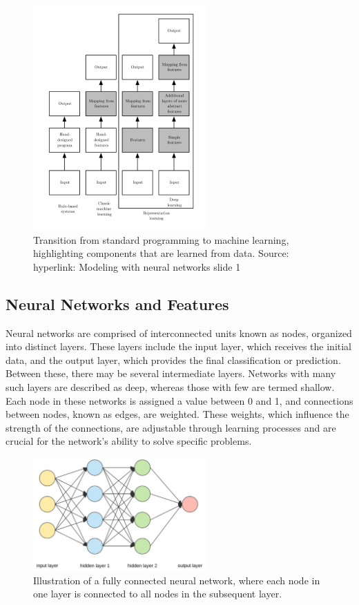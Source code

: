 \begin{figure}
    \centering
    \includegraphics[width=250px]{Figures/MLintro/ml.png}
    \caption{Transition from standard programming to machine learning, highlighting components that are learned from data. Source: hyperlink: Modeling with neural networks slide 1}
    \label{fig: fromProgrammingToML}
\end{figure}

\subsection{Neural Networks and Features}

Neural networks are comprised of interconnected units known as nodes, organized into distinct layers. These layers include the input layer, which receives the initial data, and the output layer, which provides the final classification or prediction. Between these, there may be several intermediate layers. Networks with many such layers are described as deep, whereas those with few are termed shallow\cite{Sarker2021}. Each node in these networks is assigned a value between 0 and 1, and connections between nodes, known as edges, are weighted. These weights, which influence the strength of the connections, are adjustable through learning processes and are crucial for the network's ability to solve specific problems\cite{Witten2005}.

\begin{figure}
    \centering
    \includegraphics[width=250px]{Figures/MLintro/nn.jpg}
    \caption{Illustration of a fully connected neural network, where each node in one layer is connected to all nodes in the subsequent layer.}
    \label{fig: nn2ex}
\end{figure}

